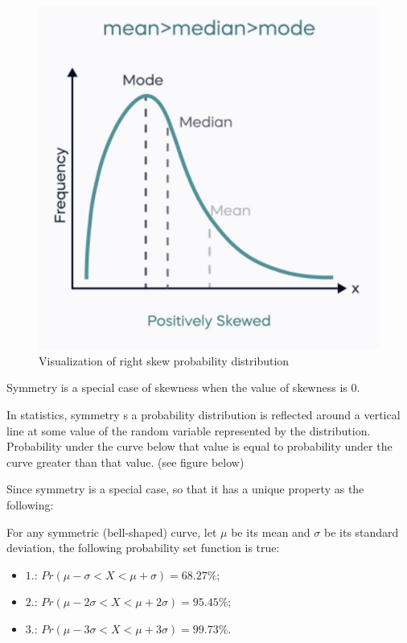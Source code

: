 \begin{figure}[H]
 \centering
 \includegraphics[scale=0.45]{Section1/img/Rightskew.jpg}
 \caption{Visualization of right skew probability distribution}
\end{figure}

\noindent
Symmetry is a special case of skewness when the value of skewness is $0$.

\begin{definition}[Symmetry]
In statistics, symmetry s a probability distribution is reflected around a vertical line at some value of the random variable represented by the distribution. Probability under the curve below that value is equal to probability under the curve greater than that value. (see figure below)
\end{definition}

\noindent
Since symmetry is a special case, so that it has a unique property as the following:

\begin{theorem}
For any symmetric (bell-shaped) curve, let $\mu$ be its mean and $\sigma$ be its standard deviation, the following probability set function is true:
   \begin{itemize}
    \item  $1.$: $Pr(\mu - \sigma < X < \mu + \sigma) = 68.27\%;$
    \item  $2.$: $Pr(\mu - 2\sigma < X < \mu + 2\sigma) = 95.45\%;$
    \item  $3.$: $Pr(\mu - 3\sigma < X < \mu + 3\sigma) = 99.73\%.$
   \end{itemize}
\end{theorem}

